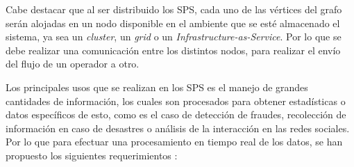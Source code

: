 Cabe destacar que al ser distribuido los SPS, cada uno de las vértices del grafo serán alojadas en un nodo disponible en el ambiente que se esté almacenado el sistema, ya sea un \textit{cluster}, un \textit{grid} o un \textit{Infrastructure-as-Service}. Por lo que se debe realizar una comunicación entre los distintos nodos, para realizar el envío del flujo de un operador a otro.

Los principales usos que se realizan en los SPS es el manejo de grandes cantidades de información, los cuales son procesados para obtener estadísticas o datos específicos de esto, como es el caso de detección de fraudes, recolección de información en caso de desastres o análisis de la interacción en las redes sociales. Por lo que para efectuar una procesamiento en tiempo real de los datos, se han propuesto los siguientes requerimientos \citep{StonebrakerCZ05}:

